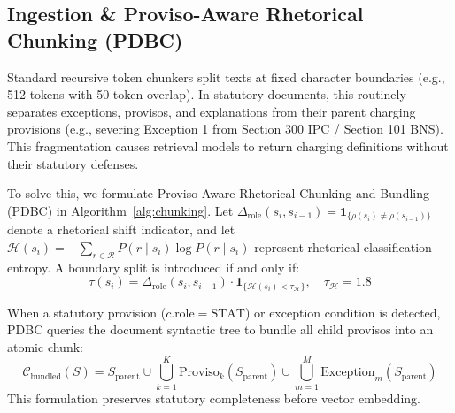 \documentclass[conference]{IEEEtran}
\begin{document}
\subsection{Ingestion \& Proviso-Aware Rhetorical Chunking (PDBC)}
Standard recursive token chunkers split texts at fixed character boundaries (e.g., 512 tokens with 50-token overlap). In statutory documents, this routinely separates exceptions, provisos, and explanations from their parent charging provisions (e.g., severing Exception 1 from Section 300 IPC / Section 101 BNS). This fragmentation causes retrieval models to return charging definitions without their statutory defenses.

To solve this, we formulate Proviso-Aware Rhetorical Chunking and Bundling (PDBC) in Algorithm~\ref{alg:chunking}. Let $\Delta_{\text{role}}(s_i, s_{i-1}) = \mathbf{1}_{\{\rho(s_i) \ne \rho(s_{i-1})\}}$ denote a rhetorical shift indicator, and let $\mathcal{H}(s_i) = -\sum_{r \in \mathcal{R}} P(r \mid s_i) \log P(r \mid s_i)$ represent rhetorical classification entropy. A boundary split is introduced if and only if:
\begin{equation}
\tau(s_i) = \Delta_{\text{role}}(s_i, s_{i-1}) \cdot \mathbf{1}_{\{\mathcal{H}(s_i) < \tau_{\mathcal{H}}\}}, \quad \tau_{\mathcal{H}} = 1.8
\end{equation}

When a statutory provision ($c.\text{role} = \text{STAT}$) or exception condition is detected, PDBC queries the document syntactic tree to bundle all child provisos into an atomic chunk:
\begin{equation}
\mathcal{C}_{\text{bundled}}(S) = S_{\text{parent}} \cup \bigcup_{k=1}^K \text{Proviso}_k(S_{\text{parent}}) \cup \bigcup_{m=1}^M \text{Exception}_m(S_{\text{parent}})
\end{equation}
This formulation preserves statutory completeness before vector embedding.
\end{document}
